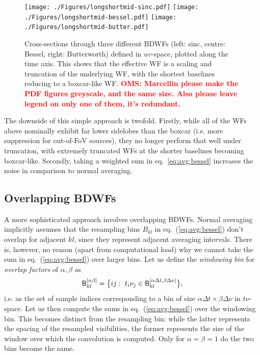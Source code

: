 \documentclass[useAMS,usenatbib]{mn2e}
\newcommand{\OMS}[1]{\textcolor{red}{{\bf OMS: #1}}}
\begin{document}
\begin{figure}%
\texttt{[image: ./Figures/longshortmid-sinc.pdf]}\hfill%
\texttt{[image: ./Figures/longshortmid-bessel.pdf]}\hfill%
\texttt{[image: ./Figures/longshortmid-butter.pdf]}
\caption{Cross-sections through three different BDWFs (left: sinc, centre: Bessel, right: Butterworth) defined in $uv$-space, 
plotted along the time axis. This shows that the effective WF is a scaling and truncation of the underlying WF, with
the shortest baselines reducing to a boxcar-like WF. \OMS{Marcellin please make the PDF figures greyscale, and the same size.
Also please leave legend on only one of them, it's redundant.}}
\label{fig:WF:perbaseline}
\end{figure}

The downside of this simple approach is twofold. Firstly, while all of the WFs above nominally exhibit far lower 
sidelobes than the boxcar
(i.e. more suppression for out-of-FoV sources), they no longer perform that well under truncation, with extremely truncated WFs 
at the shorter baselines becoming boxcar-like. Secondly, taking a weighted sum in eq.~\ref{eq:avg:bessel} increases 
the noise in comparison to normal averaging.

\subsection{Overlapping BDWFs}
\label{baseline2}

A more sophisticated approach involves overlapping BDWFs. Normal averaging implicitly assumes that the resampling bins $B_{kl}$ 
in eq.~(\ref{eq:avg:bessel}) don't overlap for adjacent $kl$, since they represent adjacent averaging intervals. 
There is, however, no reason (apart from computational load) why we cannot take the sum in eq.~(\ref{eq:avg:bessel}) 
over larger bins. Let us define the \emph{windowing bin} for \emph{overlap factors} of $\alpha,\beta$ as
\begin{equation}
\mathsf{B}^{[\alpha\beta]}_{kl} = \big \{ ij:~t_i\nu_j \in \mathsf{B}^{[\alpha\Delta t,\beta\Delta\nu]}_{kl} \big \},
\end{equation}
i.e. as the set of sample indices corresponding to a bin of size $\alpha\Delta t\times\beta\Delta \nu$ in $t\nu$-space.
Let us then compute the sums in eq.~(\ref{eq:avg:bessel}) over the windowing bin. This becomes distinct from the
resampling bin: while the latter represents the spacing of the resampled visibilities, the former represents the size 
of the window over which the convolution is computed. Only for $\alpha=\beta=1$ do the two bins become the same.
\end{document}
